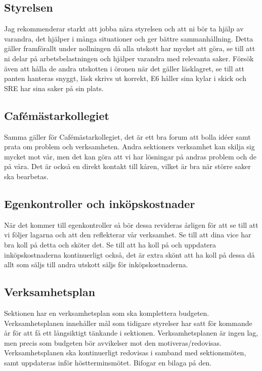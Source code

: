 \documentclass[10pt]{article}
\begin{document}
\subsection{Styrelsen}
Jag rekommenderar starkt att jobba nära styrelsen och att ni bör ta hjälp av varandra, det hjälper i många situationer och ger bättre sammanhållning. Detta gäller framförallt under nollningen då alla utskott har mycket att göra, se till att ni delar på arbetsbelastningen och hjälper varandra med relevanta saker. Försök även att hålla de andra utskotten i öronen när det gäller läsklagret, se till att panten hanteras snyggt, läsk skrivs ut korrekt, E6 håller sina kylar i skick och SRE har sina saker på sin plats.

\subsection{Cafémästarkollegiet}
Samma gäller för Cafémästarkollegiet, det är ett bra forum att bolla idéer samt prata om problem och verksamheten. Andra sektioners verksamhet kan skilja sig mycket mot vår, men det kan göra att vi har lösningar på andras problem och de på våra. Det är också en direkt kontakt till kåren, vilket är bra när större saker ska bearbetas.

\subsection{Egenkontroller och inköpskostnader}
När det kommer till egenkontroller så bör dessa revideras årligen för att se till att vi följer lagarna och att den reflekterar vår verksamhet. Se till att dina vice har bra koll på detta och sköter det.
Se till att ha koll på och uppdatera inköpskostnaderna kontinuerligt också, det är extra skönt att ha koll på dessa då allt som säljs till andra utskott säljs för inköpskostnaderna.

\subsection{Verksamhetsplan}
Sektionen har en verksamhetsplan som ska komplettera budgeten. Verksamhetsplanen innehåller mål som tidigare styrelser har satt för kommande år för att få ett långsiktigt tänkande i sektionen. Verksamhetsplanen är ingen lag, men precis som budgeten bör avvikelser mot den motiveras/redovisas. Verksamhetsplanen ska kontinuerligt redovisas i samband med sektionsmöten, samt uppdateras inför höstterminsmötet. Bifogar en bilaga på den.
\end{document}
